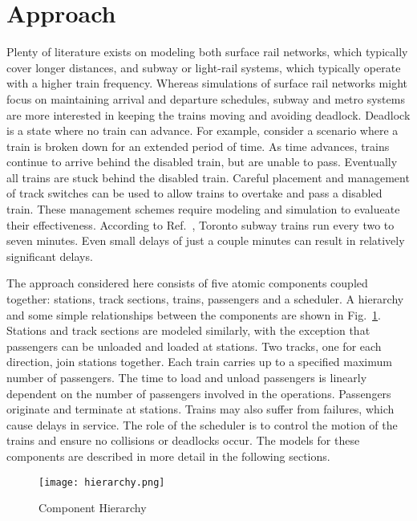 \section{Approach}
Plenty of literature exists on modeling both surface rail networks, which typically cover longer distances, and subway or light-rail systems, which typically operate with a higher train frequency. Whereas simulations of surface rail networks might focus on maintaining arrival and departure schedules, subway and metro systems are more interested in keeping the trains moving and avoiding deadlock.  Deadlock is a state where no train can advance.  For example, consider a scenario where a train is broken down for an extended period of time.  As time advances, trains continue to arrive behind the disabled train, but are unable to pass.  Eventually all trains are stuck behind the disabled train.  Careful placement and management of track switches can be used to allow trains to overtake and pass a disabled train. These management schemes require modeling and simulation to evalueate their effectiveness.  According to Ref.~, Toronto subway trains run every two to seven minutes. Even small delays of just a couple minutes can result in relatively significant delays.

The approach considered here consists of five atomic components coupled together: stations, track sections, trains, passengers and a scheduler. A hierarchy and some simple relationships between the components are shown in Fig.~\ref{fig:hierarchy}.  Stations and track sections are modeled similarly, with the exception that passengers can be unloaded and loaded at stations. Two tracks, one for each direction, join stations together. Each train carries up to a specified maximum number of passengers. The time to load and unload passengers is linearly dependent on the number of passengers involved in the operations. Passengers originate and terminate at stations.  Trains may also suffer from failures, which cause delays in service.  The role of the scheduler is to control the motion of the trains and ensure no collisions or deadlocks occur.  The models for these components are described in more detail in the following sections.
%
\begin{figure}[htb]
	\centering
	\texttt{[image: hierarchy.png]}
	\caption{Component Hierarchy}
	\label{fig:hierarchy}
\end{figure}
%
